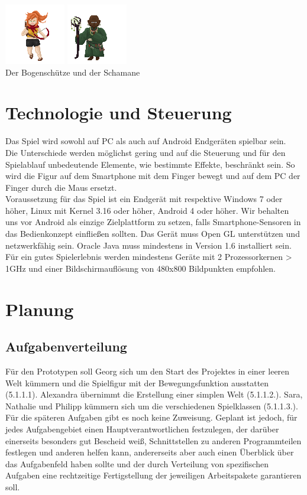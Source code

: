 \documentclass[10pt,a4paper,notitlepage]{report}
\begin{document}
\begin{flushleft}
\begin{center}
	\includegraphics[scale=2]{Archer}
	\includegraphics[scale=2]{Shaman}\\
	Der Bogenschütze und der Schamane\\

	\end{center}
\chapter{Technologie und Steuerung}
Das Spiel wird sowohl auf PC als auch auf Android Endgeräten spielbar sein.\\
Die Unterschiede werden möglichst gering und auf die Steuerung und für den Spielablauf unbedeutende Elemente, wie bestimmte Effekte, beschränkt sein. So wird die Figur auf dem Smartphone mit dem Finger bewegt und auf dem PC der Finger durch die Maus ersetzt.\\
Voraussetzung für das Spiel ist ein Endgerät mit respektive Windows 7 oder höher, Linux mit Kernel 3.16 oder höher, Android 4 oder höher. Wir behalten uns vor Android als einzige Zielplattform zu setzen, falls Smartphone-Sensoren in das Bedienkonzept einfließen sollten. Das Gerät muss Open GL unterstützen und netzwerkfähig sein. Oracle Java muss mindestens in Version 1.6 installiert sein. Für ein gutes Spielerlebnis werden mindestens Geräte mit 2 Prozessorkernen > 1GHz und einer Bildschirmauflösung von 480x800 Bildpunkten empfohlen.

\chapter{Planung}
\section{Aufgabenverteilung}
Für den Prototypen soll Georg sich um den Start des Projektes in einer leeren Welt kümmern und die Spielfigur mit der Bewegungsfunktion ausstatten (5.1.1.1). Alexandra übernimmt die Erstellung einer simplen Welt (5.1.1.2.). Sara, Nathalie und Philipp kümmern sich um die verschiedenen Spielklassen (5.1.1.3.).\\
Für die späteren Aufgaben gibt es noch keine Zuweisung. Geplant ist jedoch, für jedes Aufgabengebiet einen Hauptverantwortlichen festzulegen, der darüber einerseits besonders gut Bescheid weiß, Schnittstellen zu anderen Programmteilen festlegen und anderen helfen kann, andererseits aber auch einen Überblick über das Aufgabenfeld haben sollte und der durch Verteilung von spezifischen Aufgaben eine rechtzeitige Fertigstellung der jeweiligen Arbeitspakete garantieren soll.\\

\end{flushleft}
\end{document}
